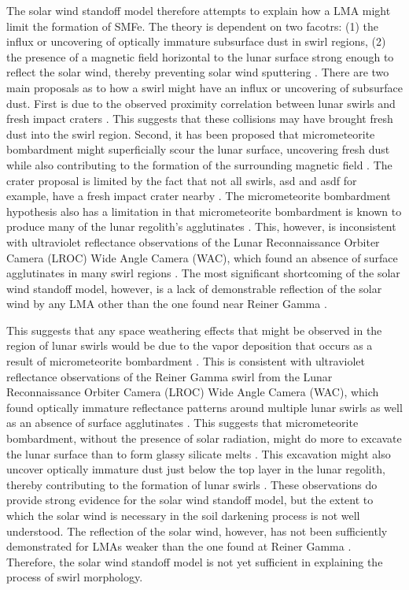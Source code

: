 The solar wind standoff model therefore attempts to explain how a LMA might limit the formation of SMFe.  The theory is dependent on two facotrs: (1) the influx or uncovering of optically immature subsurface dust in swirl regions, (2) the presence of a magnetic field horizontal to the lunar surface strong enough to reflect the solar wind, thereby preventing solar wind sputtering \cite{glotch2015formation}.  There are two main proposals as to how a swirl might have an influx or uncovering of subsurface dust.  First is due to the observed proximity correlation between lunar swirls and fresh impact craters \cite{}.  This suggests that these collisions may have brought fresh dust into the swirl region.  Second, it has been proposed that micrometeorite bombardment might superficially scour the lunar surface, uncovering fresh dust while also contributing to the formation of the surrounding magnetic field \cite{}.  The crater proposal is limited by the fact that not all swirls, asd and asdf for example, have a fresh impact crater nearby \cite{}.  The micrometeorite bombardment hypothesis also has a limitation in that micrometeorite bombardment is known to produce many of the lunar regolith's agglutinates \cite{}.  This, however, is inconsistent with ultraviolet reflectance observations of the Lunar Reconnaissance Orbiter Camera (LROC) Wide Angle Camera (WAC), which found an absence of surface agglutinates in many swirl regions \cite{denevi2014characterization}.  The most significant shortcoming of the solar wind standoff model, however, is a lack of demonstrable reflection of the solar wind by any LMA other than the one found near Reiner Gamma \cite{lucey2006understanding}. 

This suggests that any space weathering effects that might be observed in the region of lunar swirls would be due to the vapor deposition that occurs as a result of micrometeorite bombardment \cite{glotch2015formation}.  This is consistent with ultraviolet reflectance observations of the Reiner Gamma swirl from the Lunar Reconnaissance Orbiter Camera (LROC) Wide Angle Camera (WAC), which found optically immature reflectance patterns around multiple lunar swirls as well as an absence of surface agglutinates \cite{denevi2014characterization}.  This suggests that micrometeorite bombardment, without the presence of solar radiation, might do more to excavate the lunar surface than to form glassy silicate melts \cite{denevi2014characterization}.  This excavation might also uncover optically immature dust just below the top layer in the lunar regolith, thereby contributing to the formation of lunar swirls \cite{}.  These observations do provide strong evidence for the solar wind standoff model, but the extent to which the solar wind is necessary in the soil darkening process is not well understood.  The reflection of the solar wind, however, has not been sufficiently demonstrated for LMAs weaker than the one found at Reiner Gamma \cite{lucey2006understanding}.  Therefore, the solar wind standoff model is not yet sufficient in explaining the process of swirl morphology.   \par

